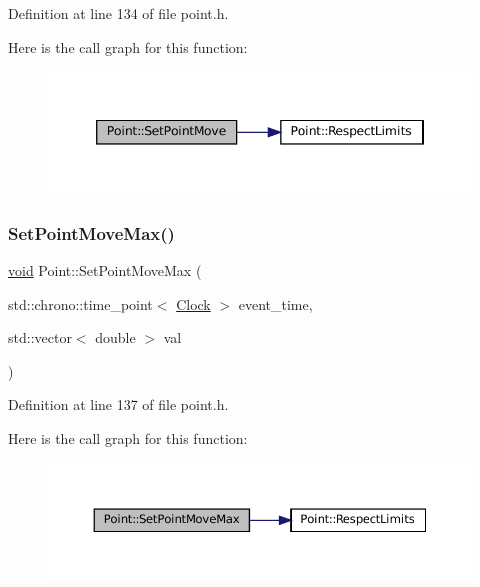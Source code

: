 Definition at line 134 of file point.\+h.

Here is the call graph for this function\+:\nopagebreak
\begin{figure}[H]
\begin{center}
\leavevmode
\includegraphics[width=346pt]{class_point_a2cf44d5cf17ecf2b3385bde963678589_cgraph}
\end{center}
\end{figure}
\mbox{\label{class_point_afa3c2290a72c99e8892029eaa6676204}} 
\subsubsection{\texorpdfstring{Set\+Point\+Move\+Max()}{SetPointMoveMax()}}
{\footnotesize\ttfamily \mbox{\hyperlink{glad_8h_a950fc91edb4504f62f1c577bf4727c29}{void}} Point\+::\+Set\+Point\+Move\+Max (\begin{DoxyParamCaption}\item[{std\+::chrono\+::time\+\_\+point$<$ \mbox{\hyperlink{universe_8h_a0ef8d951d1ca5ab3cfaf7ab4c7a6fd80}{Clock}} $>$}]{event\+\_\+time,  }\item[{std\+::vector$<$ double $>$}]{val }\end{DoxyParamCaption})\hspace{0.3cm}{\ttfamily [inline]}}



Definition at line 137 of file point.\+h.

Here is the call graph for this function\+:\nopagebreak
\begin{figure}[H]
\begin{center}
\leavevmode
\includegraphics[width=350pt]{class_point_afa3c2290a72c99e8892029eaa6676204_cgraph}
\end{center}
\end{figure}
\mbox{\label{class_point_a7c9776ffca2fde856fa8eaee669d9881}} 
